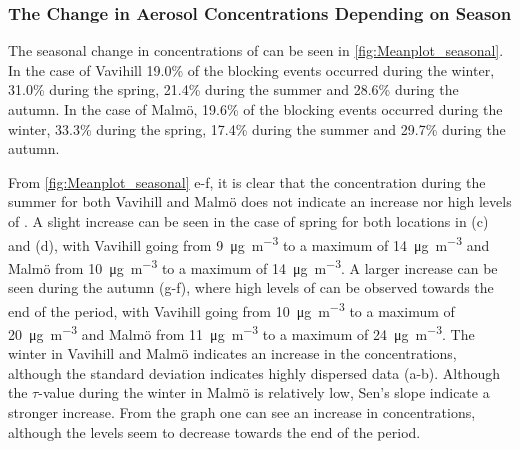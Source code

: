  

\subsubsection{The Change in Aerosol Concentrations Depending on Season}
The seasonal change in concentrations of \PM can be seen in \autoref{fig:Meanplot_seasonal}. In the case of Vavihill 19.0\% of the blocking events occurred during the winter, 31.0\% during the spring, 21.4\% during the summer and 28.6\% during the autumn. In the case of Malmö, 19.6\% of the blocking events occurred during the winter, 33.3\% during the spring, 17.4\% during the summer and 29.7\% during the autumn. 

From \autoref{fig:Meanplot_seasonal} e-f, it is clear that the concentration during the summer for both Vavihill and Malmö does not indicate an increase nor high levels of \PM. A slight increase can be seen in the case of spring for both locations in (c) and (d), with Vavihill going from \SI{9}{\micro\gram\per\meter\cubed} to a maximum of \SI{14}{\micro\gram\per\meter\cubed} and Malmö from \SI{10}{\micro\gram\per\meter\cubed} to a maximum of \SI{14}{\micro\gram\per\meter\cubed}. A larger increase can be seen during the autumn (g-f), where high levels of \PM can be observed towards the end of the period, with Vavihill going from \SI{10}{\micro\gram\per\meter\cubed} to a maximum of \SI{20}{\micro\gram\per\meter\cubed} and Malmö from \SI{11}{\micro\gram\per\meter\cubed} to a maximum of \SI{24}{\micro\gram\per\meter\cubed}. The winter in Vavihill and Malmö indicates an increase in the \PM concentrations, although the standard deviation indicates highly dispersed data (a-b). Although the $\tau$-value during the winter in Malmö is relatively low, Sen's slope indicate a stronger increase. From the graph one can see an increase in \PM concentrations, although the levels seem to decrease towards the end of the period. 

